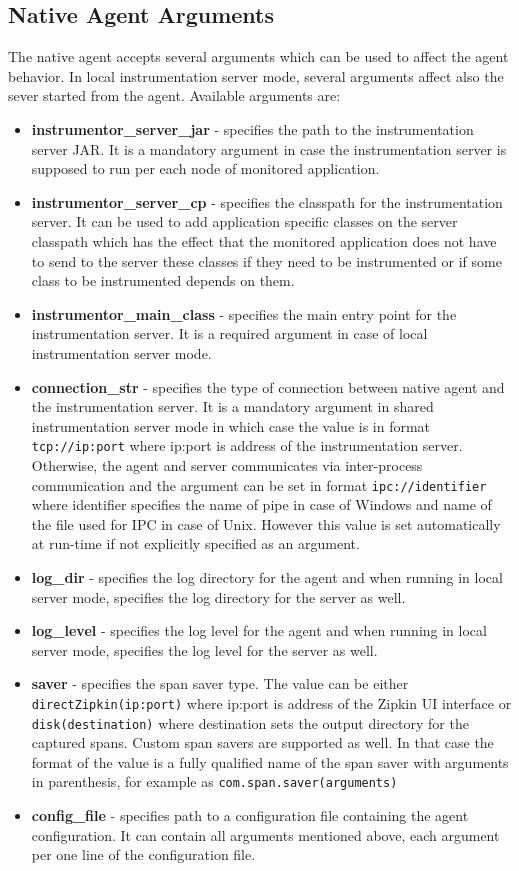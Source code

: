 \subsection{Native Agent Arguments}
The native agent accepts several arguments which can be used to affect the agent behavior. In local instrumentation server mode, several arguments affect also the sever started from the agent. Available arguments are:
\begin{itemize}
	\item \textbf{instrumentor\_server\_jar} - specifies the path to the instrumentation server JAR. It is a mandatory argument in case the instrumentation server is supposed to run per each node of monitored application.
	\item \textbf{instrumentor\_server\_cp} - specifies the classpath for the instrumentation server. It can be used to add application specific classes on the server classpath which has the effect that the monitored application does not have to send to the server these classes if they need to be instrumented or if some class to be instrumented depends on them.
	\item \textbf{instrumentor\_main\_class} - specifies the main entry point for the instrumentation server. It is a required argument in case of local instrumentation server mode.
	\item \textbf{connection\_str} - specifies the type of connection between native agent and the instrumentation server. It is a mandatory argument in shared instrumentation server mode in which case the value is in format \texttt{tcp://ip:port} where ip:port is address of the instrumentation server. Otherwise, the agent and server communicates via inter-process communication and the argument can be set in format \texttt{ipc://identifier} where identifier specifies the name of pipe in case of Windows and name of the file used for IPC in case of Unix. However this value is set automatically at run-time if not explicitly specified as an argument.
	\item \textbf{log\_dir} - specifies the log directory for the agent and when running in local server mode, specifies the log directory for the server as well.
	\item \textbf{log\_level} - specifies the log level for the agent and when running in local server mode, specifies the log level for the server as well.
	\item \textbf{saver} - specifies the span saver type. The value can be either \texttt{directZipkin(ip:port)} where ip:port is address of the Zipkin UI interface or \texttt{disk(destination)} where destination sets the output directory for the captured spans. Custom span savers are supported as well. In that case the format of the value is a fully qualified name of the span saver with arguments in parenthesis, for example as \texttt{com.span.saver(arguments)}
	\item \textbf{config\_file} - specifies path to a configuration file containing the agent configuration. It can contain all arguments mentioned above, each argument per one line of the configuration file.
\end{itemize}

